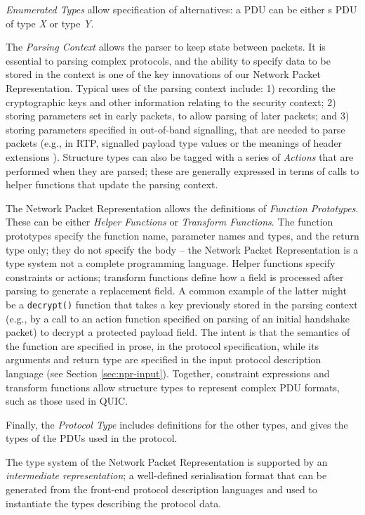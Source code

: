 \documentclass[10pt,sigconf]{acmart}
\begin{document}
\emph{Enumerated Types} allow specification of alternatives: a PDU can
be either s PDU of type \emph{X} or type \emph{Y}. 

The \emph{Parsing Context} allows the parser to keep state between packets.
It is essential to parsing complex protocols, and the ability to specify
data to be stored in the context is one of the key innovations of our
Network Packet Representation.
Typical uses of the parsing context include:
1) recording the cryptographic keys and other information relating to the
   security context;
2) storing parameters set in early packets, to allow parsing of later 
   packets; and
3) storing parameters specified in out-of-band signalling, that are 
   needed to parse packets (e.g., in RTP, signalled
   payload type values or the meanings of header extensions \cite{RFC5285}).
Structure types can also be tagged with a series of \emph{Actions} that are
performed when they are parsed; these are generally expressed in terms of calls
to helper functions that update the parsing context.

The Network Packet Representation allows the definitions of \emph{Function
Prototypes}. These can be either \emph{Helper Functions} or \emph{Transform
Functions}.
The function prototypes specify the function name, parameter names and types,
and the return type only; they do not specify the body -- the Network Packet
Representation is a type system not a complete programming language.
Helper functions specify constraints or actions; transform functions define
how a field is processed after parsing to generate a replacement field.
A common example of the latter might be a \texttt{decrypt()} function that
takes a key previously stored in the parsing context (e.g., by a call to an
action function specified on parsing of an initial handshake packet) to
decrypt a protected payload field.  The intent is that the semantics of the
function are specified in prose, in the protocol specification, while its
arguments and return type are specified in the input protocol description
language (see Section \ref{sec:npr-input}).
Together, constraint expressions and transform functions allow structure
types to represent complex PDU formats, such as those used in QUIC.

Finally, the \emph{Protocol Type} includes definitions for the other types,
and gives the types of the PDUs used in the protocol.

The type system of the Network Packet Representation is supported by an
\emph{intermediate representation}; a well-defined serialisation format
that can be generated from the front-end protocol description languages
and used to instantiate the types describing the protocol data.
\end{document}
